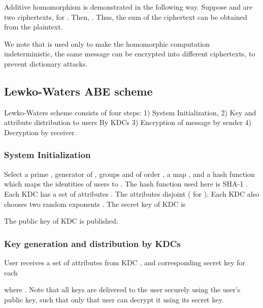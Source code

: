 \documentclass[conference]{IEEEtran}[10pt]
\begin{document}
Additive homomorphism is demonstrated in the following way.
Suppose  and  are two ciphertexts, for .
Then, .
Thus, the sum of the ciphertext can be obtained from the plaintext.

We note that  is used only to make the homomorphic computation indeterministic, the same message can be encrypted into different ciphertexts, to
prevent dictionary attacks.
 
\subsection{Lewko-Waters ABE scheme}
\label{subsec:lewko-waters}
Lewko-Waters \cite{LW11} scheme consists of four steps: 1) System Initialization, 
2) Key and attribute distribution to users By KDCs 3) Encryption of message by sender 
4) Decryption by receiver. 

\subsubsection{System Initialization}
\label{subsec:system_init1}
Select a prime , generator  of , 
groups  and  of order ,  
a map , and
a hash function  which maps the identities of users to .
The hash function used here is SHA-1 \cite{S06}. 
Each KDC  has a set of attributes . The attributes disjoint  ( for ).
Each KDC  also chooses two random exponents .
The secret key of KDC  is 

The public key of KDC  is published: 


\subsubsection{Key generation and distribution by KDCs}
\label{subsec:key_gen1}
User  receives a set of attributes  from KDC , and corresponding secret key  for each 


where . 
Note that all keys are delivered to the user securely using the user's public key, such that only that user can decrypt it using its secret key. 
\end{document}
